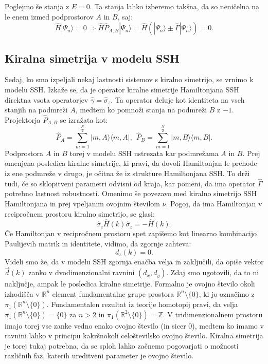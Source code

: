 Poglejmo še stanja z $E = 0$. Ta stanja lahko izberemo takšna, da so neničelna na le enem izmed podprostorov $A$ in $B$, saj:
\begin{equation}
\hat{H} | \Psi_n \rangle = 0  \Rightarrow  \hat{H} \hat{P}_{A,B} |\Psi_n \rangle = \hat{H} ( | \Psi_n \rangle \pm \hat{\Gamma} | \Psi_n \rangle ) = 0.
\end{equation}
\subsection{Kiralna simetrija v modelu SSH}
Sedaj, ko smo izpeljali nekaj lastnosti sistemov s kiralno simetrijo, se vrnimo k modelu SSH.
Izkaže se, da je operator kiralne simetrije Hamiltonjana SSH direktna vsota operatorjev $\hat{\gamma} = \hat{\sigma}_z$. Ta operator deluje kot identiteta na vseh stanjih na podmreži $A$, medtem ko pomnoži stanja na podmreži $B$ z $-1$.
Projektorja $\hat{P}_{A,B}$ se izražata kot:
\begin{equation}
\hat{P}_A = \sum_{m=1}^{\frac{N}{2}}  | m, A \rangle \langle m, A |, \ \ \hat{P}_B = \sum_{m=1}^{\frac{N}{2}}  | m, B \rangle \langle m, B |.
\end{equation}
Podprostora $A$ in $B$ torej v modelu SSH ustrezata kar podmrežama $A$ in $B$.
Prej omenjena posledica kiralne simetrije, ki pravi, da dovoli Hamiltonjan le prehode iz ene podmreže v drugo, je očitna že iz strukture Hamiltonjana SSH. To drži tudi, če so sklopitveni parametri odvisni od kraja, kar pomeni, da ima operator $\hat{\Gamma}$ potrebno lastnost robustnosti.
Omenimo še povezavo med kiralno simetrijo SSH Hamiltonjana in prej vpeljanim ovojnim številom $\nu$.
Pogoj, da ima Hamiltonjan v recipročnem prostoru kiralno simetrijo, se glasi: 
\begin{equation}
\hat{\sigma}_z \hat{H}(k) \hat{\sigma}_z = - \hat{H}(k).
\end{equation}
Če Hamiltonjan v recipročnem prostoru spet zapišemo kot linearno kombinacijo Paulijevih matrik in identitete, vidimo, da zgornje zahteva:
\begin{equation}
d_z (k) = 0.
\end{equation}
Videli smo že, da v modelu SSH zgornja enačba velja in zaključili, da opiše vektor $\vec{d}(k)$ zanko v dvodimenzionalni ravnini $(d_x, d_y)$. Zdaj smo ugotovili, da to ni naključje, ampak le posledica kiralne simetrije. Formalno je ovojno število okoli izhodišča v $\mathbb{R}^n$ element fundamentalne grupe prostora $\mathbb{R}^n \setminus \{0\}$, ki jo označimo z $\pi_1 ( \mathbb{R}^n \setminus \{0 \})$. Fundamentalen rezultat iz teorije homotopij \cite{hatcher} pravi, da velja  $\pi_1 ( \mathbb{R}^n \setminus \{0 \}) = \{ 0 \}$ za $n>2$  in  $\pi_1 ( \mathbb{R}^2 \setminus \{0 \}) = \mathbb{Z}$.
V tridimenzionalnem prostoru imajo torej vse zanke vedno enako ovojno število (in sicer $0$), medtem ko imamo v ravnini lahko v principu kakršnokoli celoštevilsko ovojno število. Kiralna simetrija je torej tukaj potrebna, da se sploh lahko začnemo pogovarjati o možnosti različnih faz, katerih ureditveni parameter je ovojno število.

